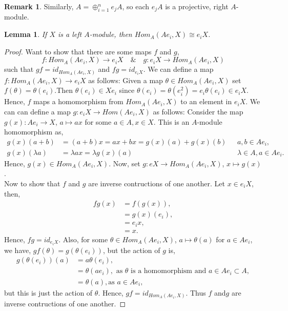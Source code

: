 \documentclass[11.5pt, twoside, a4paper, titlepage]{report}
\theoremstyle{definition}
\newtheorem{rem}[mydef]{Remark}
\theoremstyle{plain}
\newtheorem{lem}[mydef]{Lemma}
\begin{document}
\begin{rem}
Similarly, $A=\oplus_{i=1}^ne_jA$, so each $e_jA$ is a projective, right $A$-module.
\end{rem}

\begin{lem} \label{idempotenthomlem}
If $X$ is a left $A$-module, then $Hom_A(Ae_i,X)\cong e_iX$.
\end{lem}
\begin{proof}
Want to show that there are some maps $f$ and $g$,
\begin{equation*}
f: Hom_A(Ae_i, X) \to e_iX \quad \& \quad g: e_iX\to Hom_A(Ae_i, X)
\end{equation*}
such that $gf=id_{Hom_A(Ae_i, X)}$ and $fg=id_{e_iX}$.
We can define a map $f: Hom_A(Ae_i,X) \to e_iX$ as follows: Given a map $\theta \in Hom_A(Ae_i, X)$ set $f(\theta)=\theta(e_i)$.Then $\theta (e_i) \in Xe_i$ since $\theta(e_i)=\theta(e_i^2)=e_i\theta(e_i)\in e_iX$. Hence, $f$ maps a homomorphism from $Hom_A(Ae_i, X)$ to an element in $e_iX$.  We can can define a map $g:e_iX \to Hom(Ae_i, X)$ as follows: Consider the map $g(x): Ae_i \to X$, $a \mapsto ax$ for some $a\in A, x\in X$. This is an $A$-module homomorphism as, 
\begin{align*}
g(x)(a+b) &=(a+b)x=ax+bx=g(x)(a)+g(x)(b)\text{ } & a, b\in Ae_i,\\
g(x)(\lambda a) &=\lambda a x=\lambda g(x)(a) \text{ } & \lambda\in A, a \in Ae_i.
\end{align*}
Hence, $g(x) \in Hom_A(Ae_i, X)$. Now, set $g: eX \to Hom_A(Ae_i, X)$, $x \mapsto g(x)$. \\
Now to show that $f$ and $g$ are inverse contructions of one another. Let $x\in e_iX$, then,
\begin{align*}
fg(x)&=f(g(x)),\\
&=g(x)(e_i),\\
&=e_ix,\\
&=x.
\end{align*}
Hence, $fg=id_{e_iX}$. Also, for some $\theta \in Hom_A(Ae_i,X)$, $a \mapsto \theta(a)$ for $a\in Ae_i$, we have, $gf(\theta)=g(\theta(e_i))$, but the action of $g$ is,
\begin{align*}
g(\theta(e_i))(a)&=a\theta(e_i), \\
&=\theta(ae_i), \text{ as } \theta \text{ is a homomorphism and } a\in Ae_i\subset A,\\
&=\theta(a), \text{as } a\in Ae_i,
\end{align*}
but this is just the action of $\theta$. Hence, $gf=id_{Hom_A(Ae_i,X)}$. Thus $f$ and$g$ are inverse contructions of one another.
\end{proof}
\end{document}
